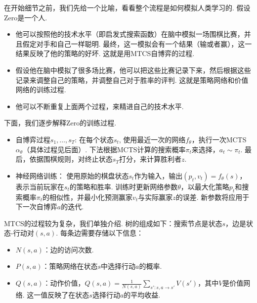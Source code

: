 在开始细节之前，我们先给一个比喻，看看整个流程是如何模拟人类学习的. 假设Zero是一个人. 
\begin{itemize}
    \item 他可以按照他的技术水平（即启发式搜索函数）在脑中模拟一场围棋比赛，并且假定对手和自己一样聪明. 最终，这一模拟会有一个结果（输或者赢），这一结果反映了他的策略的好坏. 这就是用MTCS自博弈的过程.
    \item 假设他在脑中模拟了很多场比赛，他可以把这些比赛记录下来，然后根据这些记录来调整自己的策略，并调整自己对于胜率的评判. 这就是策略网络和价值网络的训练过程.
    \item 他可以不断重复上面两个过程，来精进自己的技术水平. 
\end{itemize}

下面，我们逐步解释Zero的训练过程.

\begin{itemize}
    \item 自博弈过程$s_1,\dots,s_T$: 在每个状态$s_t$, 使用最近一次的网络$f_\theta$，执行一次MCTS $\alpha_\theta$（具体过程见后面）. 下法根据MCTS计算的搜索概率$\pi_t$来选择，$a_t\sim\pi_t$. 最后，依据围棋规则，对终止状态$s_T$打分，来计算胜利者$z$. 
    \item 神经网络训练： 使用原始的棋盘状态$s_t$作为输入，输出$(p_t,v_t)=f_\theta(s)$，表示当前玩家在$s_t$的策略和胜率. 训练时更新网络参数$\theta$，以最大化策略$p_t$和搜索概率$\pi_t$的相似性，并最小化预测赢家$v_t$与实际赢家$z$的误差. 新参数将应用于下一次自博弈$a$的迭代.     
\end{itemize}

MTCS的过程较为复杂，我们单独介绍. 树的组成如下：搜索节点是状态$s$，边是状态-行动对$(s,a)$. 每条边需要存储以下信息：
\begin{itemize}
    \item $N(s,a)$：边的访问次数.
    \item $P(s,a)$：策略网络在状态$s$中选择行动$a$的概率.
    \item $Q(s,a)$：动作价值，$Q(s,a)=\frac{1}{N(s,a)}\sum_{s':s,a\to s'} V(s')$，其中$V$是价值网络. 这一值反映了在状态$s$选择行动$a$的平均收益.
\end{itemize}

